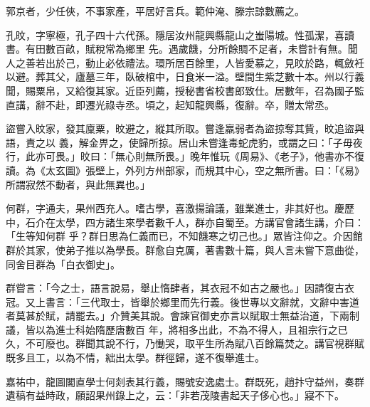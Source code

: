 \begin{pinyinscope}
 郭京者，少任俠，不事家產，平居好言兵。範仲淹、滕宗諒數薦之。



 孔旼，字寧極，孔子四十六代孫。隱居汝州龍興縣龍山之蚩陽城。性孤潔，喜讀書。有田數百畝，賦稅常為鄉里
 先。遇歲饑，分所餘賙不足者，未嘗計有無。聞人之善若出於己，動止必依禮法。環所居百餘里，人皆愛慕之，見旼於路，輒斂衽以避。葬其父，廬墓三年，臥破棺中，日食米一溢。壁間生紫芝數十本。州以行義聞，賜粟帛，又給復其家。近臣列薦，授秘書省校書郎致仕。居數年，召為國子監直講，辭不赴，即遷光祿寺丞。頃之，起知龍興縣，復辭。卒，贈太常丞。



 盜嘗入旼家，發其廩粟，旼避之，縱其所取。嘗逢羸弱者為盜掠奪其貲，旼追盜與語，責之以
 義，解金畀之，使歸所掠。居山未嘗逢毒蛇虎豹，或謂之曰：「子毋夜行，此亦可畏。」旼曰：「無心則無所畏。」晚年惟玩《周易》、《老子》，他書亦不復讀。為《太玄圖》張壁上，外列方州部家，而規其中心，空之無所書。曰：「《易》所謂寂然不動者，與此無異也。」



 何群，字通夫，果州西充人。嗜古學，喜激揚論議，雖業進士，非其好也。慶歷中，石介在太學，四方諸生來學者數千人，群亦自蜀至。方講官會諸生講，介曰：「生等知何群
 乎？群日思為仁義而已，不知饑寒之切己也。」眾皆注仰之。介因館群於其家，使弟子推以為學長。群愈自克厲，著書數十篇，與人言未嘗下意曲從，同舍目群為「白衣御史」。



 群嘗言：「今之士，語言說易，舉止惰肆者，其衣冠不如古之嚴也。」因請復古衣冠。又上書言：「三代取士，皆舉於鄉里而先行義。後世專以文辭就，文辭中害道者莫甚於賦，請罷去。」介贊美其說。會諫官御史亦言以賦取士無益治道，下兩制議，皆以為進士科始隋歷唐數百
 年，將相多出此，不為不得人，且祖宗行之已久，不可廢也。群聞其說不行，乃慟哭，取平生所為賦八百餘篇焚之。講官視群賦既多且工，以為不情，絀出太學。群徑歸，遂不復舉進士。



 嘉祐中，龍圖閣直學士何剡表其行義，賜號安逸處士。群既死，趙抃守益州，奏群遺稿有益時政，願詔果州錄上之，云：「非若茂陵書起天子侈心也。」寢不下。



\end{pinyinscope}